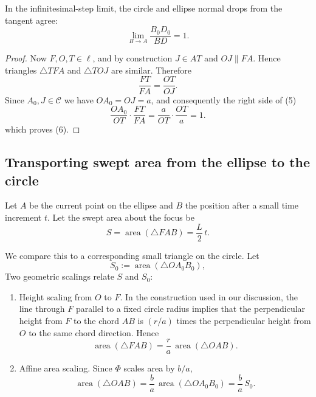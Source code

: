 \begin{lemma}
  \label{lem:matching-drops}
  In the infinitesimal-step limit, the circle and ellipse normal drops from the tangent agree:
  \begin{equation}
    \boxed{\;\lim_{B\to A}\frac{B_0D_0}{BD}=1.\;}
  \end{equation}
\end{lemma}
\begin{proof}
  Now $F,O,T\in\ell$, and by construction $J\in AT$ and $OJ\parallel FA$. Hence triangles $\triangle TFA$ and $\triangle TOJ$ are similar. Therefore
  \[
    \frac{FT}{FA}=\frac{OT}{OJ}.
  \]
  Since $A_0,J\in\mathcal C$ we have $OA_0=OJ=a$, and consequently the right side of (5)
  \[
    \frac{OA_0}{OT}\cdot\frac{FT}{FA}=\frac{a}{OT}\cdot\frac{OT}{a}=1.
  \]
  which proves (6).
\end{proof}

\subsection{Transporting swept area from the ellipse to the circle}
\label{sec:transport-and-sagitta}

Let $A$ be the current point on the ellipse and $B$ the position after a small time increment $t$. Let the swept area about the focus be
\begin{equation}
  S = \operatorname{area}(\triangle F A B)=\frac{L}{2}\,t.
\end{equation}

We compare this to a corresponding small triangle on the circle. Let
\begin{equation}
  S_0 := \operatorname{area}(\triangle O A_0 B_0),
\end{equation}
Two geometric scalings relate $S$ and $S_0$:
\begin{enumerate}
  \item Height scaling from $O$ to $F$. In the construction used in our discussion, the line through $F$ parallel to a fixed circle radius implies that the perpendicular height from $F$ to the chord $AB$ is $(r/a)$ times the perpendicular height from $O$ to the same chord direction. Hence
    \begin{equation}
      \operatorname{area}(\triangle F A B)=\frac{r}{a}\,\operatorname{area}(\triangle O A B).
    \end{equation}

  \item Affine area scaling. Since $\Phi$ scales area by $b/a$,
    \begin{equation}
      \operatorname{area}(\triangle O A B)=\frac{b}{a}\,\operatorname{area}(\triangle O A_0 B_0)=\frac{b}{a}\,S_0.
    \end{equation}
\end{enumerate}

